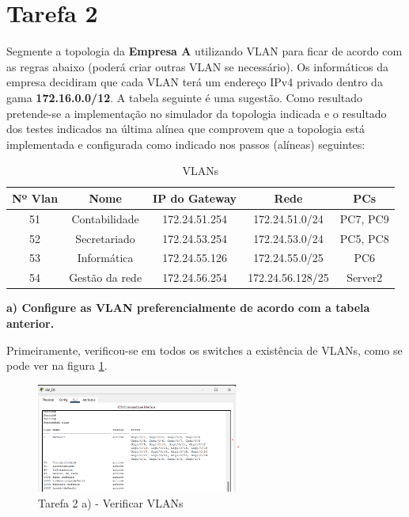 \documentclass[11pt,english, openright, oneside]{book}
\begin{document}
\pagebreak



\section{Tarefa 2}

Segmente a topologia da \textbf{Empresa A} utilizando VLAN para ficar de acordo
com as regras abaixo (poderá criar outras VLAN se necessário). Os informáticos
da empresa decidiram que cada VLAN terá um endereço IPv4 privado dentro da gama
\textbf{172.16.0.0/12}. A tabela seguinte é uma sugestão. Como resultado
pretende-se a implementação no  simulador da topologia indicada e o resultado
dos testes indicados na última alínea que comprovem que a topologia está
implementada e configurada como indicado nos passos (alíneas) seguintes:  

\begin{table}[h!]
\centering
\begin{tabular}{|c|c|c|c|c|}
\hline
\textbf{Nº Vlan} & \textbf{Nome} & \textbf{IP do Gateway} & \textbf{Rede} &  \textbf{PCs}\\
\hline
51 & Contabilidade & 172.24.51.254 & 172.24.51.0/24 & PC7, PC9\\
52 & Secretariado & 172.24.53.254 & 172.24.53.0/24 & PC5, PC8\\
53 & Informática & 172.24.55.126 & 172.24.55.0/25 & PC6\\
54 & Gestão da rede & 172.24.56.254 & 172.24.56.128/25 & Server2\\
\hline
\end{tabular}
\caption{VLANs}
\label{tab:vlan}
\end{table}
\vspace{0.8cm}

\textbf{a) Configure as VLAN preferencialmente de acordo com a tabela anterior.}
\vspace{0.2cm}

Primeiramente, verificou-se em todos os switches a existência de VLANs, como se pode ver na figura \ref{fig:2a1}. 

\begin{figure}[H]
    \centering
    \includegraphics[width=0.6\textwidth]{imagens/Tarefa2/2.a.1.png}
    \caption{Tarefa 2 a) - Verificar VLANs}
    \label{fig:2a1}
\end{figure}
\end{document}
